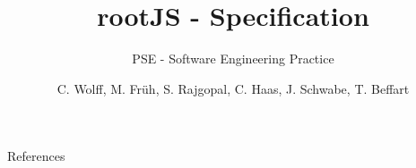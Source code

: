 \documentclass[18pt]{beamer}
\title[rootJS]{rootJS - Specification}
\subtitle{PSE - Software Engineering Practice}
\author{C. Wolff, M. Fr\"uh, S. Rajgopal, C. Haas, J. Schwabe, T. Beffart}
\institute{Steinbruch Center for Computing}
\begin{document}

\begin{frame}
\titlepage
\end{frame}











\appendix
\beginbackup

\begin{frame}[allowframebreaks]{References}
\printbibliography
\end{frame}

\backupend
\end{document}
